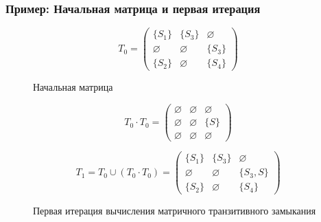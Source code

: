\documentclass{beamer}
\begin{document}
\begin{frame}[fragile]
	\transwipe[direction=90]
	\frametitle{Пример: Начальная матрица и первая итерация}
\begin{figure}[h]
\[
T_0 = \begin{pmatrix}
    \{S_1\} & \{S_3\} & \varnothing \\ \varnothing & \varnothing & \{S_3\} \\ \{S_2\} & \varnothing & \{S_4\}
\end{pmatrix}
\]
\caption{Начальная матрица}
\label{ExampleQueryInitMatrix}
\end{figure}

\begin{figure}[h]
\[
T_0 \cdot T_0 = \begin{pmatrix}
    \varnothing & \varnothing & \varnothing \\ \varnothing & \varnothing & \{S\} \\ \varnothing & \varnothing & \varnothing
\end{pmatrix}
\]

\[
T_1 = T_0 \cup (T_0 \cdot T_0) = \begin{pmatrix}
    \{S_1\} & \{S_3\} & \varnothing \\ \varnothing & \varnothing & \{S_3, S\} \\ \{S_2\} & \varnothing & \{S_4\}
\end{pmatrix}
\]
\caption{Первая итерация вычисления матричного транзитивного замыкания}
\label{ExampleQueryFirstIteration}
\end{figure}
\end{frame}
\end{document}
